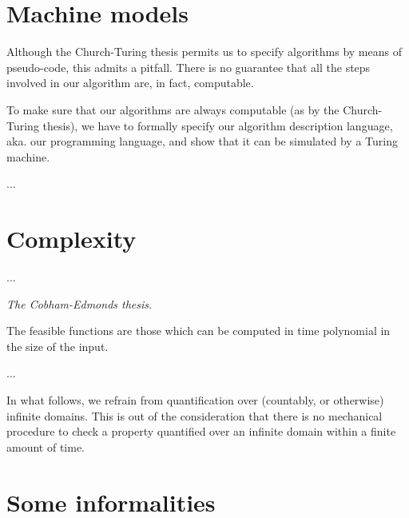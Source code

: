 \section{Machine models}

Although the Church-Turing thesis permits us to specify algorithms by means of
pseudo-code, this admits a pitfall. There is no guarantee that all the steps
involved in our algorithm are, in fact, computable.

To make sure that our algorithms are always computable (as by the Church-Turing
thesis), we have to formally specify our algorithm description language, aka.
our programming language, and show that it can be simulated by a Turing
machine.

...





\section{Complexity}

...

\begin{notion} \emph{The Cobham-Edmonds thesis.}

The feasible functions are those which can be computed in time polynomial in
the size of the input.

\end{notion}

...


In what follows, we refrain from quantification over (countably, or otherwise)
infinite domains. This is out of the consideration that there is no mechanical
procedure to check a property quantified over an infinite domain within a
finite amount of time.

\section{Some informalities}

